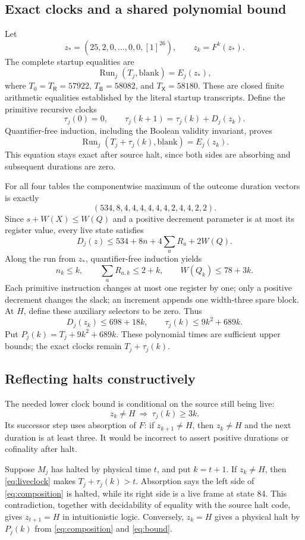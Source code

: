 \documentclass[11pt]{article}
\newcommand{\Run}{\operatorname{Run}}
\newcommand{\R}{\ensuremath{\mathsf R}}
\newcommand{\B}{\ensuremath{\mathsf B}}
\newcommand{\X}{\ensuremath{\mathsf X}}
\begin{document}
\subsection{Exact clocks and a shared polynomial bound}

Let
\[
 z_*=(25,2,0,\ldots,0,0,[1]^{26}),\qquad z_k=F^k(z_*).
\]
The complete startup equalities are
\[
 \Run_j(T_j,\mathrm{blank})=E_j(z_*),
 \tag{5}\label{eq:startup}
\]
where $T_0=T_{\R}=57922$, $T_{\B}=58082$, and $T_{\X}=58180$.
These are closed finite arithmetic equalities established by the
literal startup transcripts. Define the primitive recursive clocks
\[
 \tau_j(0)=0,\qquad
 \tau_j(k+1)=\tau_j(k)+D_j(z_k).
 \tag{6}\label{eq:clock}
\]
Quantifier-free induction, including the Boolean validity invariant,
proves
\[
 \Run_j(T_j+\tau_j(k),\mathrm{blank})=E_j(z_k).
 \tag{7}\label{eq:composition}
\]
This equation stays exact after source halt, since both sides are
absorbing and subsequent durations are zero.

For all four tables the componentwise maximum of the outcome duration
vectors is exactly
\[
 (534,8,4,4,4,4,4,4,2,4,4,2,2).
 \tag{8}\label{eq:coefficients}
\]
Since $s+W(X)\le W(Q)$ and a positive decrement parameter is at most
its register value, every live state satisfies
\[
 D_j(z)\le534+8n+4\sum_a R_a+2W(Q).
\]
Along the run from $z_*$, quantifier-free induction yields
\[
 n_k\le k,\qquad \sum_a R_{a,k}\le2+k,
 \qquad W(Q_k)\le78+3k.
\]
Each primitive instruction changes at most one register by one;
only a positive decrement changes the slack; an increment appends
one width-three spare block. At $H$, define these auxiliary selectors
to be zero. Thus
\[
 D_j(z_k)\le698+18k,\qquad
 \tau_j(k)\le9k^2+689k.
 \tag{9}\label{eq:bound}
\]
Put $P_j(k)=T_j+9k^2+689k$. These polynomial times are sufficient
upper bounds; the exact clocks remain $T_j+\tau_j(k)$.

\subsection{Reflecting halts constructively}

The needed lower clock bound is conditional on the source still being
live:
\[
 z_k\ne H\ \Longrightarrow\ \tau_j(k)\ge3k.
 \tag{10}\label{eq:liveclock}
\]
Its successor step uses absorption of $F$: if $z_{k+1}\ne H$, then
$z_k\ne H$ and the next duration is at least three. It would be
incorrect to assert positive durations or cofinality after halt.

Suppose $M_j$ has halted by physical time $t$, and put $k=t+1$.
If $z_k\ne H$, then \eqref{eq:liveclock} makes
$T_j+\tau_j(k)>t$. Absorption says the left side of
\eqref{eq:composition} is halted, while its right side is a live
frame at state 84. This contradiction, together with decidability
of equality with the source halt code, gives $z_{t+1}=H$ in
intuitionistic logic. Conversely, $z_k=H$ gives a physical halt by
$P_j(k)$ from \eqref{eq:composition} and \eqref{eq:bound}.
\end{document}
